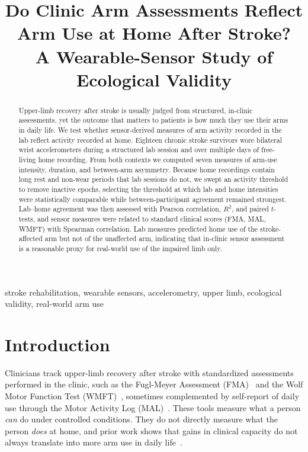 \documentclass[conference]{IEEEtran}
\begin{document}
\title{Do Clinic Arm Assessments Reflect Arm Use at Home After Stroke?\\
A Wearable-Sensor Study of Ecological Validity}

\author{
}

\maketitle

\begin{abstract}
Upper-limb recovery after stroke is usually judged from structured, in-clinic
assessments, yet the outcome that matters to patients is how much they use their
arms in daily life. We test whether sensor-derived measures of arm activity
recorded in the lab reflect activity recorded at home. Eighteen chronic stroke
survivors wore bilateral wrist accelerometers during a structured lab session and
over multiple days of free-living home recording. From both contexts we computed
seven measures of arm-use intensity, duration, and between-arm asymmetry. Because
home recordings contain long rest and non-wear periods that lab sessions do not,
we swept an activity threshold to remove inactive epochs, selecting the threshold
at which lab and home intensities were statistically comparable while
between-participant agreement remained strongest. Lab–home agreement was then
assessed with Pearson correlation, $R^2$, and paired $t$-tests, and sensor
measures were related to standard clinical scores (FMA, MAL, WMFT) with Spearman
correlation. Lab measures predicted home use of the stroke-affected arm but not of
the unaffected arm, indicating that in-clinic sensor assessment is a reasonable
proxy for real-world use of the impaired limb only.
\end{abstract}

\begin{IEEEkeywords}
stroke rehabilitation, wearable sensors, accelerometry, upper limb,
ecological validity, real-world arm use
\end{IEEEkeywords}

\section{Introduction}

Clinicians track upper-limb recovery after stroke with standardized assessments
performed in the clinic, such as the Fugl-Meyer Assessment (FMA)~\cite{fuglmeyer1975}
and the Wolf Motor Function Test (WMFT)~\cite{wolf2001}, sometimes complemented by
self-report of daily use through the Motor Activity Log (MAL)~\cite{uswatte2006mal}.
These tools measure what a person \emph{can} do under controlled conditions. They do
not directly measure what the person \emph{does} at home, and prior work shows that
gains in clinical capacity do not always translate into more arm use in daily
life~\cite{rand2012,waddell2017}.
\end{document}

